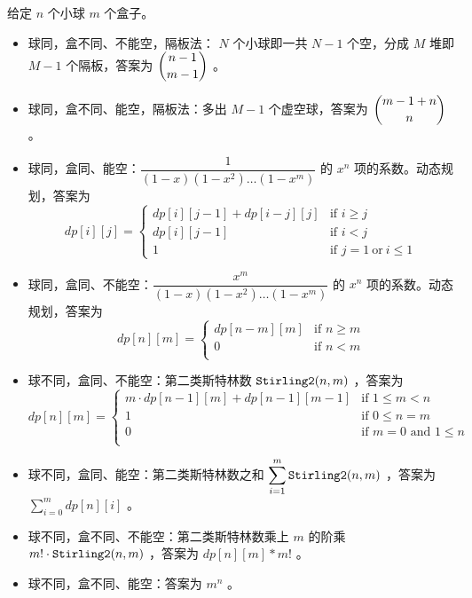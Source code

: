 给定 $n$ 个小球 $m$ 个盒子。
\begin{itemize}
    \item 球同，盒不同、不能空，隔板法： $N$ 个小球即一共 $N-1$ 个空，分成 $M$ 堆即 $M-1$ 个隔板，答案为 $\dbinom{n-1}{m-1}$ 。
    \item 球同，盒不同、能空，隔板法：多出 $M-1$ 个虚空球，答案为 $\dbinom{m-1+n}{n}$ 。
    \item 球同，盒同、能空：$\dfrac{1}{(1-x)(1-x^2)\dots(1-x^m)}$ 的 $x^n$ 项的系数。动态规划，答案为 $$
dp[i][j]= \left\{\begin{array}{ll}
dp[i][j-1]+dp[i-j][j] & \text{if } i \geq j \\
dp[i][j-1] & \text{if } i < j \\
1 & \text{if } j = 1 \ \text{or}\ i \leq 1
\end{array}\right.
$$


    \item 球同，盒同、不能空：$\dfrac{x^m}{(1-x)(1-x^2)\dots(1-x^m)}$ 的 $x^n$ 项的系数。动态规划，答案为 $$
dp[n][m]= \left\{
\begin{array}{ll}
dp[n-m][m] & \text{if } n \ge m \\
0 & \text{if } n < m \\
\end{array}
\right.
$$

    \item 球不同，盒同、不能空：第二类斯特林数 ${\tt Stirling2}(n,m)$ ，答案为 $$
dp[n][m] = \left\{
\begin{array}{ll}
m \cdot dp[n-1][m] + dp[n-1][m-1] & \text{if } 1 \le m < n \\
1 & \text{if } 0 \le n = m \\
0 & \text{if } m = 0 \text{ and } 1 \le n \\
\end{array}
\right.
$$

    \item 球不同，盒同、能空：第二类斯特林数之和 $\displaystyle\sum_{i=1}^m{\tt Stirling2}(n,m)$ ，答案为 $\sum_{i = 0}^{m} dp[n][i]$ 。
    \item 球不同，盒不同、不能空：第二类斯特林数乘上 $m$ 的阶乘 $m!\cdot{\tt Stirling2}(n,m)$ ，答案为 $dp[n][m] * m!$ 。
    \item 球不同，盒不同、能空：答案为 $m^n$ 。
\end{itemize}